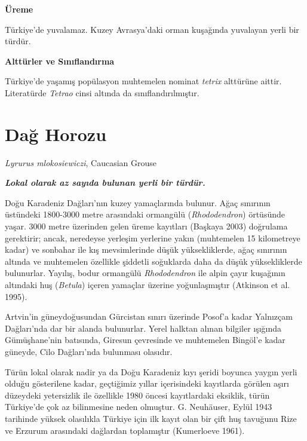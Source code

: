 \documentclass[
  letterpaper,
  DIV=11,
  numbers=noendperiod]{scrreprt}
\begin{document}
\textbf{Üreme}

Türkiye'de yuvalamaz. Kuzey Avrasya'daki orman kuşağında yuvalayan yerli
bir türdür.

\textbf{Alttürler ve Sınıflandırma}

Türkiye'de yaşamış popülasyon muhtemelen nominat \emph{tetrix} alttürüne
aittir. Literatürde \emph{Tetrao} cinsi altında da sınıflandırılmıştır.

\section{Dağ Horozu}\label{daux11f-horozu}

\emph{Lyrurus mlokosiewiczi}, Caucasian Grouse

\textbf{\emph{Lokal olarak az sayıda bulunan yerli bir türdür.}}

Doğu Karadeniz Dağları'nın kuzey yamaçlarında bulunur. Ağaç sınırının
üstündeki 1800-3000 metre arasındaki ormangülü (\emph{Rhododendron})
örtüsünde yaşar. 3000 metre üzerinden gelen üreme kayıtları (Başkaya
2003) doğrulama gerektirir; ancak, neredeyse yerleşim yerlerine yakın
(muhtemelen 15 kilometreye kadar) ve sonbahar ile kış mevsimlerinde
düşük yüksekliklerde, ağaç sınırının altında ve muhtemelen özellikle
şiddetli soğuklarda daha da düşük yüksekliklerde bulunurlar. Yayılış,
bodur ormangülü \emph{Rhododendron} ile alpin çayır kuşağının altındaki
huş (\emph{Betula}) içeren yamaçlar üzerine yoğunlaşmıştır (Atkinson et
al. 1995).

Artvin'in güneydoğusundan Gürcistan sınırı üzerinde Posof'a kadar
Yalnızçam Dağları'nda dar bir alanda bulunurlar. Yerel halktan alınan
bilgiler ışığında Gümüşhane'nin batısında, Giresun çevresinde ve
muhtemelen Bingöl'e kadar güneyde, Cilo Dağları'nda bulunması olasıdır.

Türün lokal olarak nadir ya da Doğu Karadeniz kıyı şeridi boyunca yaygın
yerli olduğu gösterilene kadar, geçtiğimiz yıllar içerisindeki
kayıtlarda görülen aşırı düzeydeki yetersizlik ile özellikle 1980 öncesi
kayıtlardaki eksiklik, türün Türkiye'de çok az bilinmesine neden
olmuştur. G. Neuhäuser, Eylül 1943 tarihinde yüksek olasılıkla Türkiye
için ilk kayıt olan bir çift huş tavuğunu Rize ve Erzurum arasındaki
dağlardan toplamıştır (Kumerloeve 1961).
\end{document}
